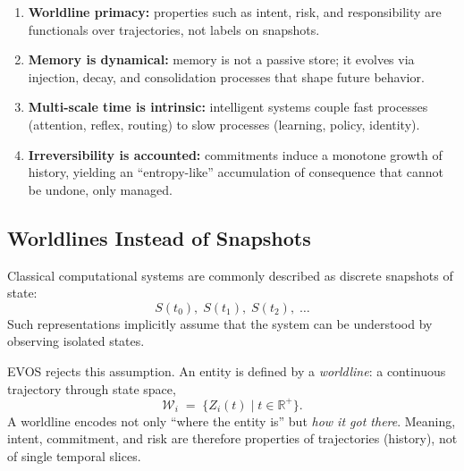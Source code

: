 \documentclass[11pt]{article}
\begin{document}
\begin{enumerate}
  \item \textbf{Worldline primacy:} properties such as intent, risk, and responsibility are
  functionals over trajectories, not labels on snapshots.

  \item \textbf{Memory is dynamical:} memory is not a passive store; it evolves via
  injection, decay, and consolidation processes that shape future behavior.

  \item \textbf{Multi-scale time is intrinsic:} intelligent systems couple fast processes
  (attention, reflex, routing) to slow processes (learning, policy, identity).

  \item \textbf{Irreversibility is accounted:} commitments induce a monotone growth of
  history, yielding an ``entropy-like'' accumulation of consequence that cannot be undone,
  only managed.
\end{enumerate}

\subsection{Worldlines Instead of Snapshots}

Classical computational systems are commonly described as discrete snapshots of state:
\[
S(t_0),\; S(t_1),\; S(t_2),\; \dots
\]
Such representations implicitly assume that the system can be understood by observing
isolated states.

EVOS rejects this assumption. An entity is defined by a \emph{worldline}: a continuous
trajectory through state space,
\[
\mathcal{W}_i \;=\; \{ Z_i(t) \mid t \in \mathbb{R}^+ \}.
\]
A worldline encodes not only ``where the entity is'' but \emph{how it got there}. Meaning,
intent, commitment, and risk are therefore properties of trajectories (history), not of
single temporal slices.
\end{document}
